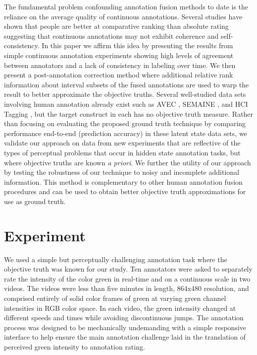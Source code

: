 \documentclass[10pt,letterpaper]{article}
\begin{document}
The fundamental problem confounding annotation fusion methods to date is the reliance on the average quality of continuous annotations.  Several studies have shown that people are better at comparative ranking than absolute rating \cite{Yannakakis2011, metallinou2013annotation, yannakakis2015ratings} suggesting that continuous annotations may not exhibit coherence and self-consistency.  In this paper we affirm this idea by presenting the results from simple continuous annotation experiments showing high levels of agreement between annotators and a lack of consistency in labeling over time.  We then present a post-annotation correction method where additional relative rank information about interval subsets of the fused annotations are used to warp the result to better approximate the objective truths.  Several well-studied data sets involving human annotation already exist such as AVEC \cite{valstar2016avec}, SEMAINE \cite{mckeown2012semaine}, and HCI Tagging \cite{soleymani2012multimodal}, but the target construct in each has no objective truth measure.  Rather than focusing on evaluating the proposed ground truth technique by comparing performance end-to-end (prediction accuracy) in these latent state data sets, we validate our approach on data from new experiments that are reflective of the types of perceptual problems that occur in hidden state annotation tasks, but where objective truths are known \textit{a priori}.  We further the utility of our approach by testing the robustness of our technique to noisy and incomplete additional information. This method is complementary to other human annotation fusion procedures and can be used to obtain better objective truth approximations for use as ground truth.

\section*{Experiment}
We used a simple but perceptually challenging annotation task where the objective truth was known for our study.  Ten annotators were asked to separately rate the intensity of the color green in real-time and on a continuous scale in two videos.  The videos were less than five minutes in length, 864x480 resolution, and comprised entirely of solid color frames of green at varying green channel intensities in RGB color space.  In each video, the green intensity changed at different speeds and times while avoiding discontinuous jumps.  The annotation process was designed to be mechanically undemanding with a simple responsive interface to help ensure the main annotation challenge laid in the translation of perceived green intensity to annotation rating.
\end{document}
